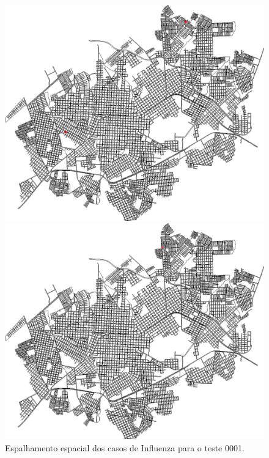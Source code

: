 \begin{figure}[H]
\begin{minipage}{.5\textwidth}
    \captionsetup{labelformat=empty}
  \end{minipage}
  \begin{minipage}{.5\textwidth}
    \centering
    \includegraphics[width=1.0\textwidth]{Figuras/Resultados/0001/Saidas_GPU_BIT/MonteCarlo_0/Simulacao_0/Casos/00160.png}
    \captionsetup{labelformat=empty}
  \end{minipage}%
  \begin{minipage}{.5\textwidth}
    \centering
    \includegraphics[width=1.0\textwidth]{Figuras/Resultados/0001/Saidas_GPU_BIT/MonteCarlo_0/Simulacao_0/Casos/00200.png}
    \captionsetup{labelformat=empty}
  \end{minipage}
  \caption{Espalhamento espacial dos casos de Influenza para o teste 0001.}
  \label{fig:casos_0001}
\end{figure}

